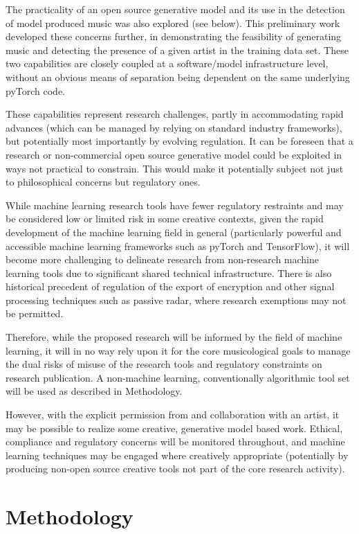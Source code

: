 \documentclass[10pt]{article}
\begin{document}
\begin{multicols*}{2}
The practicality of an open source generative model and its use in the detection of model produced music was also explored (see below). This preliminary work developed these concerns further, in demonstrating the feasibility of generating music and detecting the presence of a given artist in the training data set. These two capabilities are closely coupled at a software/model infrastructure level, without an obvious means of separation being dependent on the same underlying pyTorch code.

These capabilities represent research challenges, partly in accommodating rapid advances (which can be managed by relying on standard industry frameworks), but potentially most importantly by evolving regulation. It can be foreseen that a research or non-commercial open source generative model could be exploited in ways not practical to constrain. This would make it potentially subject not just to philosophical concerns but regulatory ones.

While machine learning research tools have fewer regulatory restraints and may be considered low or limited risk in some creative contexts, given the rapid development of the machine learning field in general (particularly powerful and accessible machine learning frameworks such as pyTorch and TensorFlow), it will become more challenging to delineate research from non-research machine learning tools due to significant shared technical infrastructure. There is also historical precedent of regulation of the export of encryption and other signal processing techniques such as passive radar\cite{munitions}, where research exemptions may not be permitted.


Therefore, while the proposed research will be informed by the field of machine learning, it will in no way rely upon it for the core musicological goals to manage the dual risks of misuse of the research tools and regulatory constraints on research publication. A non-machine learning, conventionally algorithmic tool set will be used as described in Methodology.

However, with the explicit permission from and collaboration with an artist, it may be possible to realize some creative, generative model based work. Ethical, compliance and regulatory concerns will be monitored throughout, and machine learning techniques may be engaged where creatively appropriate (potentially by producing non-open source creative tools not part of the core research activity).

  \section{Methodology}


\end{multicols*}
\end{document}
